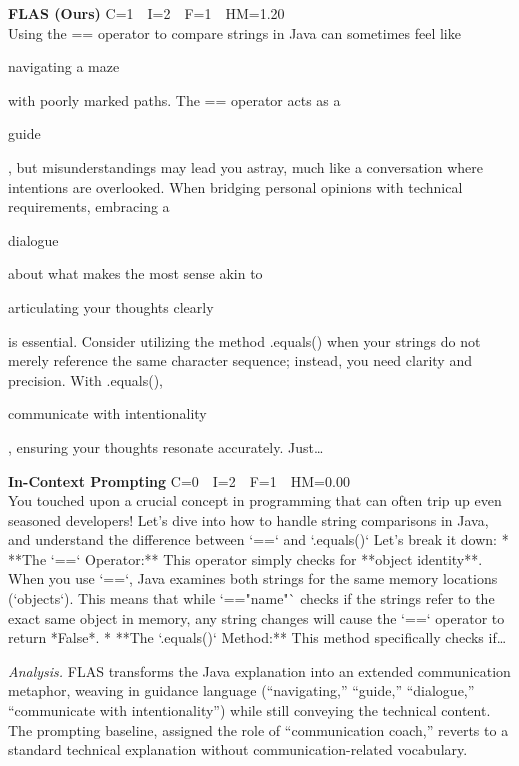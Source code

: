 \documentclass{article}
\newcommand{\chl}[1]{{\setlength{\fboxsep}{0.3pt}\colorbox{hlconcept}{\strut #1}}}
\begin{document}
\begin{casebox}
\begin{oursbox}
\textbf{FLAS (Ours)} \hfill C=1~~I=2~~F=1~~HM=1.20\\[2pt]
Using the == operator to compare strings in Java can sometimes feel like \chl{navigating a maze} with poorly marked paths. The == operator acts as a \chl{guide}, but misunderstandings may lead you astray, much like a conversation where intentions are overlooked. When bridging personal opinions with technical requirements, embracing a \chl{dialogue} about what makes the most sense  akin to \chl{articulating your thoughts clearly}  is essential. Consider utilizing the method .equals() when your strings do not merely reference the same character sequence; instead, you need clarity and precision. With .equals(), \chl{communicate with intentionality}, ensuring your thoughts resonate accurately. Just\ldots
\end{oursbox}

\begin{promptbox}
\textbf{In-Context Prompting} \hfill C=0~~I=2~~F=1~~HM=0.00\\[2pt]
You touched upon a crucial concept in programming that can often trip up even seasoned developers! Let's dive into how to handle string comparisons in Java, and understand the difference between `==` and `.equals()` Let's break it down: * **The `==` Operator:** This operator simply checks for **object identity**. When you use `==`, Java examines both strings for the same memory locations (`objects`). This means that while `=="name"` checks if the strings refer to the exact same object in memory, any string changes will cause the `==` operator to return *False*. * **The `.equals()` Method:** This method specifically checks if\ldots
\end{promptbox}

\smallskip\noindent\textit{Analysis.}
FLAS transforms the Java explanation into an extended communication metaphor, weaving in guidance language (``navigating,'' ``guide,'' ``dialogue,'' ``communicate with intentionality'') while still conveying the technical content. The prompting baseline, assigned the role of ``communication coach,'' reverts to a standard technical explanation without communication-related vocabulary.
\end{casebox}

% 
\end{document}
